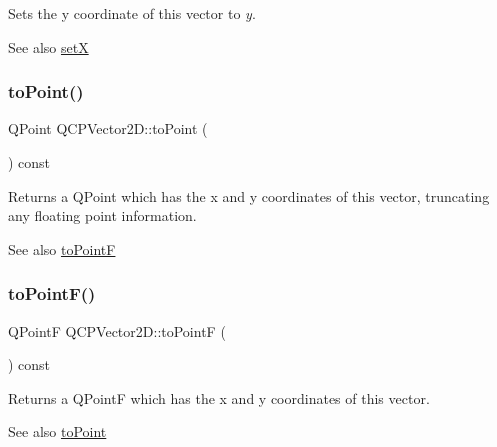 Sets the y coordinate of this vector to {\itshape y}.

\begin{DoxySeeAlso}{See also}
\mbox{\hyperlink{class_q_c_p_vector2_d_ab4249e6ce7bfc37be56f014c54b761ae}{setX}} 
\end{DoxySeeAlso}
\mbox{\label{class_q_c_p_vector2_d_add3edf75de9b7bf1abc693b973b2e906}} 
\subsubsection{\texorpdfstring{toPoint()}{toPoint()}}
{\footnotesize\ttfamily Q\+Point Q\+C\+P\+Vector2\+D\+::to\+Point (\begin{DoxyParamCaption}{ }\end{DoxyParamCaption}) const\hspace{0.3cm}{\ttfamily [inline]}}

Returns a Q\+Point which has the x and y coordinates of this vector, truncating any floating point information.

\begin{DoxySeeAlso}{See also}
\mbox{\hyperlink{class_q_c_p_vector2_d_acd7af3f4a62833ada58be3f3021dbbac}{to\+PointF}} 
\end{DoxySeeAlso}
\mbox{\label{class_q_c_p_vector2_d_acd7af3f4a62833ada58be3f3021dbbac}} 
\subsubsection{\texorpdfstring{toPointF()}{toPointF()}}
{\footnotesize\ttfamily Q\+PointF Q\+C\+P\+Vector2\+D\+::to\+PointF (\begin{DoxyParamCaption}{ }\end{DoxyParamCaption}) const\hspace{0.3cm}{\ttfamily [inline]}}

Returns a Q\+PointF which has the x and y coordinates of this vector.

\begin{DoxySeeAlso}{See also}
\mbox{\hyperlink{class_q_c_p_vector2_d_add3edf75de9b7bf1abc693b973b2e906}{to\+Point}} 
\end{DoxySeeAlso}
\mbox{\label{class_q_c_p_vector2_d_a4a099e1f9788d52cb46deb8139aa6195}} 
